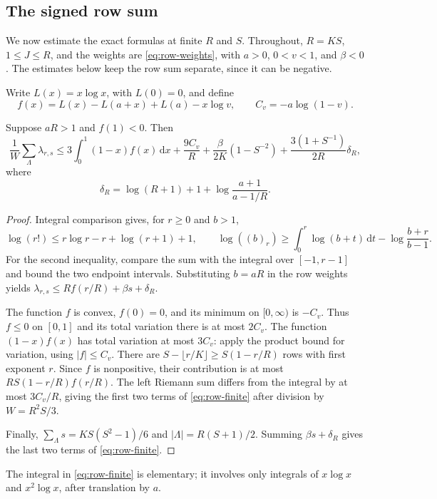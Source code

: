 \subsection{The signed row sum}
We now estimate the exact formulas at finite $R$ and $S$. Throughout,
$R=KS$, $1\leq J\leq R$, and the weights are
\eqref{eq:row-weights}, with $a>0$, $0<v<1$, and $\beta<0$.
The estimates below keep the row sum separate, since it can be negative.

Write $L(x)=x\log x$, with $L(0)=0$, and define
\[
 f(x)=L(x)-L(a+x)+L(a)-x\log v,
 \qquad C_v=-a\log(1-v).
\]
\begin{lemma}\label{lem:spectral-row-finite}
Suppose $aR>1$ and $f(1)<0$. Then
\begin{equation}\label{eq:row-finite}
 \frac1W\sum_\Lambda\lambda_{r,s}\leq
 3\int_0^1(1-x)f(x)\,\mathrm dx+\frac{9C_v}{R}
 +\frac\beta{2K}(1-S^{-2})
 +\frac{3(1+S^{-1})}{2R}\delta_R,
\end{equation}
where
\[
 \delta_R=\log(R+1)+1+\log\frac{a+1}{a-1/R}.
\]
\end{lemma}
\begin{proof}
Integral comparison gives, for $r\geq0$ and $b>1$,
\[
 \log(r!)\leq r\log r-r+\log(r+1)+1,
 \qquad
 \log((b)_r)\geq\int_0^r\log(b+t)\,\mathrm dt
                        -\log\frac{b+r}{b-1}.
\]
For the second inequality, compare the sum with the integral over
$[-1,r-1]$ and bound the two endpoint intervals. Substituting $b=aR$
in the row weights yields
$\lambda_{r,s}\leq Rf(r/R)+\beta s+\delta_R$.

The function $f$ is convex, $f(0)=0$, and its minimum on $[0,\infty)$
is $-C_v$. Thus $f\leq0$ on $[0,1]$ and its total variation there is
at most $2C_v$. The function $(1-x)f(x)$ has total variation at most
$3C_v$: apply the product bound for variation, using $|f|\leq C_v$.
There are $S-\lfloor r/K\rfloor\geq S(1-r/R)$ rows with first
exponent $r$. Since $f$ is nonpositive, their contribution is at most
$RS(1-r/R)f(r/R)$. The left Riemann sum differs from the integral
by at most $3C_v/R$, giving the first two terms of
\eqref{eq:row-finite} after division by $W=R^2S/3$.

Finally,
$\sum_\Lambda s=KS(S^2-1)/6$ and
$|\Lambda|=R(S+1)/2$. Summing $\beta s+\delta_R$ gives the last two
terms of \eqref{eq:row-finite}.
\end{proof}
The integral in \eqref{eq:row-finite} is elementary; it involves only
integrals of $x\log x$ and $x^2\log x$, after translation by $a$.

